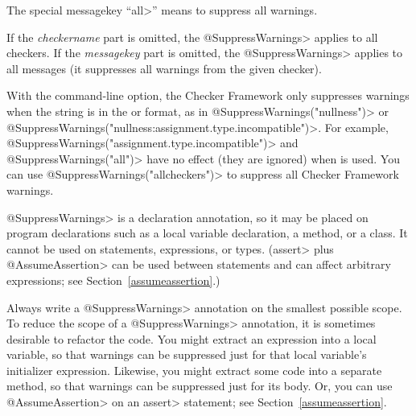The special messagekey ``\<all>'' means to suppress all warnings.

If the \emph{checkername} part is omitted, the \<@SuppressWarnings> applies
to all checkers.
If the \emph{messagekey} part is omitted, the \<@SuppressWarnings> applies
to all messages (it suppresses all warnings from the given checker).

With the  command-line
option, the Checker Framework only suppresses warnings when the string is in
the  or 
format, as in
\<@SuppressWarnings("nullness")> or
\<@SuppressWarnings("nullness:assignment.type.incompatible")>.
For example, \<@SuppressWarnings("assignment.type.incompatible")> and
\<@SuppressWarnings("all")> have no effect (they are ignored) when
 is used.  You can use
\<@SuppressWarnings("allcheckers")> to suppress all Checker Framework
warnings.

%



\<@SuppressWarnings> is a declaration annotation, so it may be placed on
program declarations such as a local variable declaration, a method, or a
class.  It cannot be used on statements, expressions, or types.
(\<assert> plus \<@AssumeAssertion> can be used between statements and can
affect arbitrary expressions; see Section~\ref{assumeassertion}.)

Always write a \<@SuppressWarnings> annotation on the smallest possible
scope.  To reduce the scope of a \<@SuppressWarnings> annotation, it is
sometimes desirable to refactor the code.  You might extract an expression
into a local variable, so that warnings can be suppressed just for that
local variable's initializer expression.  Likewise, you might extract some
code into a separate method, so that warnings can be suppressed just for
its body.  Or, you can use \<@AssumeAssertion> on an \<assert> statement;
see Section~\ref{assumeassertion}.

